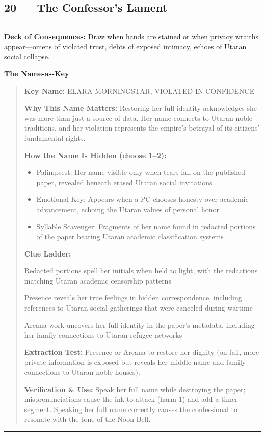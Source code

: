 \documentclass[18pt, letterpaper, twoside]{article}
\newenvironment{floorbox}[1]{%
    \begin{center}
    \begin{minipage}{0.95\textwidth}
    \subsection*{#1}
    \vspace{-0.5em}
    \rule{\textwidth}{0.5pt}
    \vspace{0.5em}
}{%
    \vspace{0.5em}
    \rule{\textwidth}{0.5pt}
    \end{minipage}
    \end{center}
}
\newenvironment{gmnote}[1]{%
    \vspace{0.5em}
    \noindent\textbf{#1}
    \begin{quote}
}{%
    \end{quote}
    \vspace{0.5em}
}
\newcommand{\deckdraw}[1]{\noindent\textbf{Deck of Consequences:} #1\par}
\newcommand{\keyname}[1]{\noindent\textbf{Key Name:} #1\par}
\newcommand{\nameimportance}[1]{\noindent\textbf{Why This Name Matters:} #1\par}
\begin{document}
\begin{floorbox}{20 --- The Confessor's Lament}
\deckdraw{Draw when hands are stained or when privacy wraiths appear---omens of violated trust, debts of exposed intimacy, echoes of Utaran social collapse.}

\begin{gmnote}{The Name-as-Key}
\keyname{ELARA MORNINGSTAR, VIOLATED IN CONFIDENCE}
\nameimportance{Restoring her full identity acknowledges she was more than just a source of data. Her name connects to Utaran noble traditions, and her violation represents the empire's betrayal of its citizens' fundamental rights.}

\textbf{How the Name Is Hidden (choose 1--2):}
\begin{itemize}[leftmargin=*]
    \item Palimpsest: Her name visible only when tears fall on the published paper, revealed beneath erased Utaran social invitations
    \item Emotional Key: Appears when a PC chooses honesty over academic advancement, echoing the Utaran values of personal honor
    \item Syllable Scavenger: Fragments of her name found in redacted portions of the paper bearing Utaran academic classification systems
\end{itemize}

\textbf{Clue Ladder:}
\begin{description}[leftmargin=*, style=unboxed]
    \item[Gentle Nudge:] Redacted portions spell her initials when held to light, with the redactions matching Utaran academic censorship patterns
    \item[Actionable Lead:] Presence reveals her true feelings in hidden correspondence, including references to Utaran social gatherings that were canceled during wartime
    \item[Aha! Proof:] Arcana work uncovers her full identity in the paper's metadata, including her family connections to Utaran refugee networks
\end{description}

\textbf{Extraction Test:} Presence or Arcana to restore her dignity (on fail, more private information is exposed but reveals her middle name and family connections to Utaran noble houses).

\textbf{Verification \& Use:} Speak her full name while destroying the paper; mispronunciations cause the ink to attack (harm 1) and add a timer segment. Speaking her full name correctly causes the confessional to resonate with the tone of the Noon Bell.
\end{gmnote}


\end{floorbox}
\end{document}
